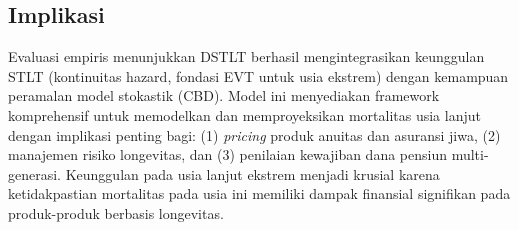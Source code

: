 \subsection{Implikasi}

Evaluasi empiris menunjukkan DSTLT berhasil mengintegrasikan keunggulan STLT (kontinuitas hazard, fondasi EVT untuk usia ekstrem) dengan kemampuan peramalan model stokastik (CBD). Model ini menyediakan framework komprehensif untuk memodelkan dan memproyeksikan mortalitas usia lanjut dengan implikasi penting bagi: (1) \textit{pricing} produk anuitas dan asuransi jiwa, (2) manajemen risiko longevitas, dan (3) penilaian kewajiban dana pensiun multi-generasi. Keunggulan pada usia lanjut ekstrem menjadi krusial karena ketidakpastian mortalitas pada usia ini memiliki dampak finansial signifikan pada produk-produk berbasis longevitas.
